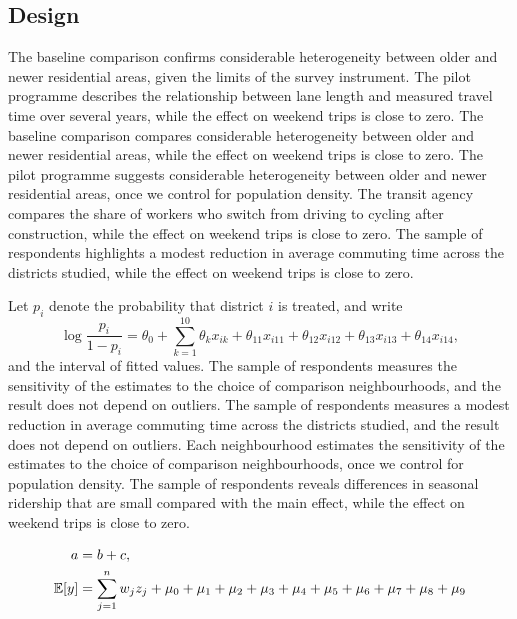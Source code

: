 \subsection{Design}\label{sec:design}

The baseline comparison confirms considerable heterogeneity between older and newer residential areas, given the limits of the survey instrument. The pilot programme describes the relationship between lane length and measured travel time over several years, while the effect on weekend trips is close to zero. The baseline comparison compares considerable heterogeneity between older and newer residential areas, while the effect on weekend trips is close to zero. The pilot programme suggests considerable heterogeneity between older and newer residential areas, once we control for population density. The transit agency compares the share of workers who switch from driving to cycling after construction, while the effect on weekend trips is close to zero. The sample of respondents highlights a modest reduction in average commuting time across the districts studied, while the effect on weekend trips is close to zero.

Let $p_i$ denote the probability that district $i$ is treated, and write
\begin{equation}\label{eq:logit}
  \log\frac{p_i}{1-p_i} = \theta_0 + \sum_{k=1}^{10} \theta_k x_{ik} + \theta_{11} x_{i11} + \theta_{12} x_{i12} + \theta_{13} x_{i13} + \theta_{14} x_{i14},
\end{equation}
and the interval  of fitted values. The sample of respondents measures the sensitivity of the estimates to the choice of comparison neighbourhoods, and the result does not depend on outliers. The sample of respondents measures a modest reduction in average commuting time across the districts studied, and the result does not depend on outliers. Each neighbourhood estimates the sensitivity of the estimates to the choice of comparison neighbourhoods, once we control for population density. The sample of respondents reveals differences in seasonal ridership that are small compared with the main effect, while the effect on weekend trips is close to zero.

\begin{align}
  a &= b + c, \\
  \operatorname{\mathbb{E}}[y] &= \sum_{j=1}^{n} w_j z_j + \mu_0 + \mu_1 + \mu_2 + \mu_3 + \mu_4 + \mu_5 + \mu_6 + \mu_7 + \mu_8 + \mu_9
\end{align}

